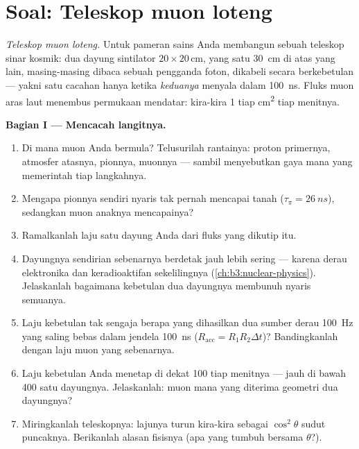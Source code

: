 \section{Soal: Teleskop muon loteng}

\begin{problem}\label{pb:b3:particle-physics:1}
\emph{Teleskop muon loteng.} Untuk pameran sains Anda membangun sebuah
teleskop sinar kosmik: dua dayung sintilator $20\times20$\,\unit{cm},
yang satu \qty{30}{cm} di atas yang lain, masing-masing dibaca sebuah pengganda foton,
dikabeli secara berkebetulan --- yakni satu cacahan hanya ketika \emph{keduanya} menyala
dalam \qty{100}{ns}. Fluks muon aras laut menembus permukaan
mendatar: kira-kira 1 tiap \unit{cm^2} tiap menitnya.

\medskip\noindent\textbf{Bagian I --- Mencacah langitnya.}

\begin{enumerate}
  \item Di mana muon Anda bermula? Telusurilah rantainya: proton
        primernya, atmosfer atasnya, pionnya, muonnya --- sambil menyebutkan gaya
        mana yang memerintah tiap langkahnya.
  \item Mengapa pionnya sendiri nyaris tak pernah mencapai
        tanah ($\tau_\pi = \qty{26}{ns}$), sedangkan muon anaknya
        mencapainya?
  \item Ramalkanlah laju satu dayung Anda dari fluks yang dikutip itu.
  \item Dayungnya sendirian sebenarnya berdetak jauh lebih sering ---
        karena derau elektronika dan keradioaktifan sekelilingnya
        (\cref{ch:b3:nuclear-physics}). Jelaskanlah bagaimana
        kebetulan dua dayungnya membunuh nyaris semuanya.
  \item Laju kebetulan tak sengaja berapa yang dihasilkan dua sumber derau
        \qty{100}{Hz} yang saling bebas dalam jendela \qty{100}{ns}
        ($R_{\text{acc}} = R_1R_2\Delta t$)? Bandingkanlah dengan
        laju muon yang sebenarnya.
  \item Laju kebetulan Anda menetap di dekat 100 tiap menitnya ---
        jauh di bawah 400 satu dayungnya. Jelaskanlah: muon mana
        yang diterima geometri dua dayungnya?
  \item Miringkanlah teleskopnya: lajunya turun kira-kira sebagai
        $\cos^2\theta$ sudut puncaknya. Berikanlah alasan fisisnya
        (apa yang tumbuh bersama $\theta$?).
\end{enumerate}


\end{problem}
